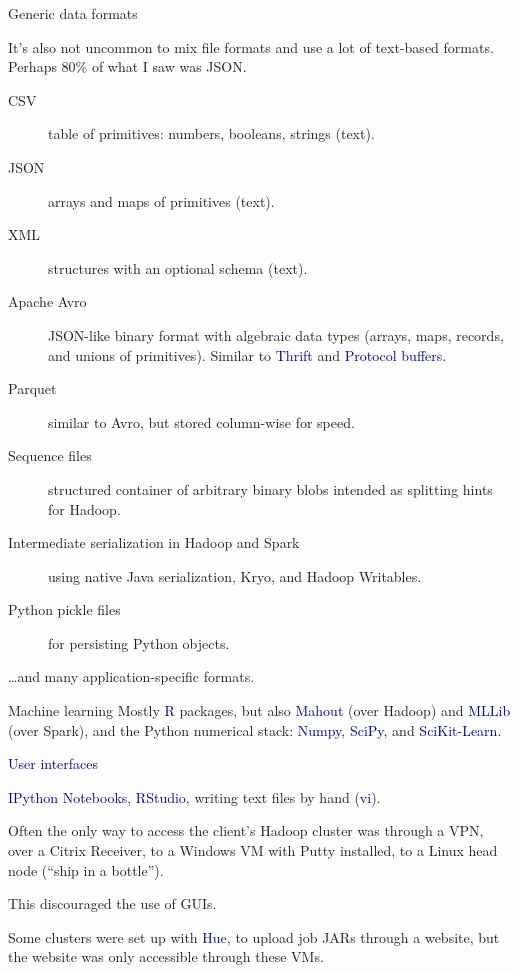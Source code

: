 \documentclass{beamer}
\begin{document}
\begin{frame}{Generic data formats}

It's also not uncommon to mix file formats and use a lot of text-based formats. Perhaps 80\% of what I saw was JSON.

\begin{description}
\item[CSV] table of primitives: numbers, booleans, strings (text).
\item[JSON] arrays and maps of primitives (text).
\item[XML] structures with an optional schema (text).
\item[Apache Avro] JSON-like binary format with algebraic data types (arrays, maps, records, and unions of primitives). Similar to \textcolor{darkblue}{Thrift} and \textcolor{darkblue}{Protocol buffers}.
\item[Parquet] similar to Avro, but stored column-wise for speed.
\item[Sequence files] structured container of arbitrary binary blobs intended as splitting hints for Hadoop.
\item[Intermediate serialization in Hadoop and Spark] using native Java serialization, Kryo, and Hadoop Writables.
\item[Python pickle files] for persisting Python objects.
\end{description}

\ldots and many application-specific formats.
\end{frame}

\begin{frame}{Machine learning}
Mostly \textcolor{darkblue}{R} packages, but also \textcolor{darkblue}{Mahout} (over Hadoop) and \textcolor{darkblue}{MLLib} (over Spark), and the Python numerical stack: \textcolor{darkblue}{Numpy}, \textcolor{darkblue}{SciPy}, and \textcolor{darkblue}{SciKit-Learn}.

\vfill
\hspace{-0.83 cm} \textcolor{darkblue}{\Large User interfaces}

\vspace{0.5 cm}
\textcolor{darkblue}{IPython Notebooks}, \textcolor{darkblue}{RStudio}, writing text files by hand (\textcolor{darkblue}{vi}).

\vspace{0.5 cm}
Often the only way to access the client's Hadoop cluster was through a VPN, over a Citrix Receiver, to a Windows VM with Putty installed, to a Linux head node (``ship in a bottle'').

\vspace{0.1 cm}
This discouraged the use of GUIs.

\vspace{0.5 cm}
Some clusters were set up with \textcolor{darkblue}{Hue}, to upload job JARs through a website, but the website was only accessible through these VMs.
\end{frame}
\end{document}
